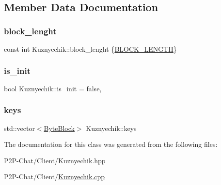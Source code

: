 \subsection{Member Data Documentation}
\mbox{\label{class_kuznyechik_acf61a43f8d6c726b0d334df98bdc0337}} 
\subsubsection{\texorpdfstring{block\+\_\+lenght}{block\_lenght}}
{\footnotesize\ttfamily const int Kuznyechik\+::block\+\_\+lenght \{\hyperlink{_kuznyechik_8hpp_a22a79078d4bc53268ab86f316856248f}{B\+L\+O\+C\+K\+\_\+\+L\+E\+N\+G\+TH}\}\hspace{0.3cm}{\ttfamily [static]}}

\mbox{\label{class_kuznyechik_ad174f2e619e033cc9f29a265825aba41}} 
\subsubsection{\texorpdfstring{is\+\_\+init}{is\_init}}
{\footnotesize\ttfamily bool Kuznyechik\+::is\+\_\+init = false\hspace{0.3cm}{\ttfamily [static]}, {\ttfamily [private]}}

\mbox{\label{class_kuznyechik_a19e910dc6d7358b07ab733c31ae52b8d}} 
\subsubsection{\texorpdfstring{keys}{keys}}
{\footnotesize\ttfamily std\+::vector$<$\hyperlink{class_byte_block}{Byte\+Block}$>$ Kuznyechik\+::keys\hspace{0.3cm}{\ttfamily [private]}}



The documentation for this class was generated from the following files\+:\begin{DoxyCompactItemize}
\item 
P2\+P-\/\+Chat/\+Client/\hyperlink{_kuznyechik_8hpp}{Kuznyechik.\+hpp}\item 
P2\+P-\/\+Chat/\+Client/\hyperlink{_kuznyechik_8cpp}{Kuznyechik.\+cpp}\end{DoxyCompactItemize}
